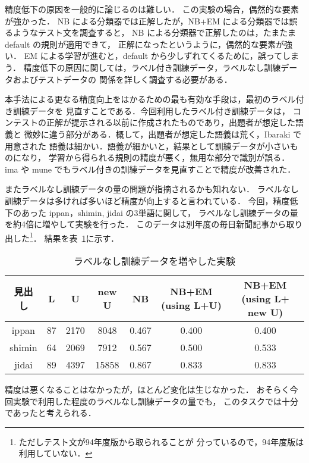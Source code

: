 \noindent
精度低下の原因を一般的に論じるのは難しい．
この実験の場合，偶然的な要素が強かった．
NB による分類器では正解したが，NB+EM による分類器では誤るようなテスト文を調査すると，
NB による分類器で正解したのは，たまたま default の規則が適用できて，
正解になったというように，偶然的な要素が強い．
EM による学習が進むと，default から少しずれてくるために，誤ってしまう．
精度低下の原因に関しては，ラベル付き訓練データ，ラベルなし訓練データおよびテストデータの
関係を詳しく調査する必要がある．

本手法による更なる精度向上をはかるための最も有効な手段は，最初のラベル付き訓練データを
見直すことである．今回利用したラベル付き訓練データは，
コンテストの正解が提示される以前に作成されたものであり，出題者が想定した語義と
微妙に違う部分がある．概して，出題者が想定した語義は荒く，Ibaraki で用意された
語義は細かい．語義が細かいと，結果として訓練データが小さいものになり，
学習から得られる規則の精度が悪く，無用な部分で識別が誤る．
ima や mune でもラベル付きの訓練データを見直すことで精度が改善された．

またラベルなし訓練データの量の問題が指摘されるかも知れない．
ラベルなし訓練データは多ければ多いほど精度が向上すると言われている．
今回，精度低下のあった ippan，shimin, jidai の3単語に関して，
ラベルなし訓練データの量を約4倍に増やして実験を行った．
このデータは別年度の毎日新聞記事から取り出した\footnote{ただしテスト文が94年度版から取られることが
分っているので，94年度版は利用していない．}．
結果を\mbox{表 \ref{muchunlabel}}に示す．

\begin{table}[htbp]
  \begin{center}
    \leavevmode
    \caption{ラベルなし訓練データを増やした実験}\label{muchunlabel}
    \begin{tabular}{|c|c|c|c|c|c|c|} \hline
見出し    &  L    &  U    &  new U    & NB      & NB+EM (using L+U)  & NB+EM (using L+ new U)  \\ \hline
ippan     &   87  & 2170  &  8048     & 0.467    &  0.400  &  0.400           \\ 
shimin    &   64  & 2069  &  7912     & 0.567    &  0.500  &  0.533           \\ 
jidai     &   89  & 4397  & 15858     & 0.867    &  0.833  &  0.833           \\  \hline
    \end{tabular}
  \end{center}
\end{table}

精度は悪くなることはなかったが，ほとんど変化は生じなかった．
おそらく今回実験で利用した程度のラベルなし訓練データの量でも，
このタスクでは十分であったと考えられる．

